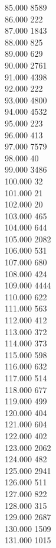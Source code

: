 { 85.000	8589 \\
 86.000	222 \\
 87.000	1843 \\
 88.000	825 \\
 89.000	629 \\
 90.000	2761 \\
 91.000	4398 \\
 92.000	222 \\
 93.000	4800 \\
 94.000	4532 \\
 95.000	223 \\
 96.000	413 \\
 97.000	7579 \\
 98.000	40 \\
 99.000	3486 \\
 100.000	32 \\
 101.000	21 \\
 102.000	20 \\
 103.000	465 \\
 104.000	644 \\
 105.000	2082 \\
 106.000	531 \\
 107.000	680 \\
 108.000	424 \\
 109.000	4444 \\
 110.000	622 \\
 111.000	563 \\
 112.000	412 \\
 113.000	372 \\
 114.000	373 \\
 115.000	598 \\
 116.000	632 \\
 117.000	514 \\
 118.000	677 \\
 119.000	499 \\
 120.000	404 \\
 121.000	604 \\
 122.000	402 \\
 123.000	2062 \\
 124.000	482 \\
 125.000	2941 \\
 126.000	511 \\
 127.000	822 \\
 128.000	315 \\
 129.000	2687 \\
 130.000	1509 \\
 131.000	1015 \\
}

